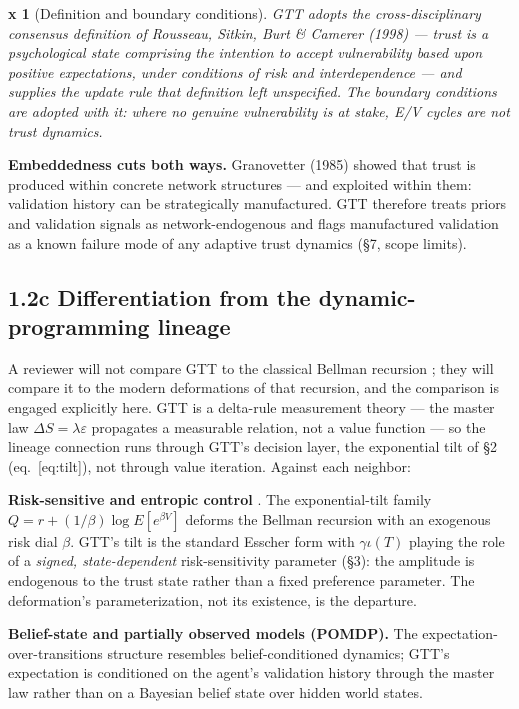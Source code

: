 \documentclass[
]{article}
\begin{document}
\textbf{x 1} (Definition and boundary conditions). \emph{GTT adopts the
cross-disciplinary consensus definition of Rousseau, Sitkin, Burt \&
Camerer (1998) --- trust is a psychological state comprising the
intention to accept vulnerability based upon positive expectations,
under conditions of risk and interdependence --- and supplies the update
rule that definition left unspecified. The boundary conditions are
adopted with it: where no genuine vulnerability is at stake, E/V cycles
are not trust dynamics.}

\textbf{Embeddedness cuts both ways.} Granovetter (1985) showed that
trust is produced within concrete network structures --- and exploited
within them: validation history can be strategically manufactured. GTT
therefore treats priors and validation signals as network-endogenous and
flags manufactured validation as a known failure mode of any adaptive
trust dynamics (§7, scope limits).

\subsection{1.2c Differentiation from the dynamic-programming
lineage}\label{c-differentiation-from-the-dynamic-programming-lineage}

A reviewer will not compare GTT to the classical Bellman recursion ;
they will compare it to the modern deformations of that recursion, and
the comparison is engaged explicitly here. GTT is a delta-rule
measurement theory --- the master law \(\Delta S = \lambda\varepsilon\)
propagates a measurable relation, not a value function --- so the
lineage connection runs through GTT's decision layer, the exponential
tilt of §2 (eq.~{[}eq:tilt{]}), not through value iteration. Against
each neighbor:

\textbf{Risk-sensitive and entropic control} . The exponential-tilt
family \(Q = r + (1/\beta)\log E[e^{\beta V}]\) deforms the Bellman
recursion with an exogenous risk dial \(\beta\). GTT's tilt is the
standard Esscher form with \(\gamma\iota(T)\) playing the role of a
\emph{signed, state-dependent} risk-sensitivity parameter (§3): the
amplitude is endogenous to the trust state rather than a fixed
preference parameter. The deformation's parameterization, not its
existence, is the departure.

\textbf{Belief-state and partially observed models (POMDP).} The
expectation-over-transitions structure resembles belief-conditioned
dynamics; GTT's expectation is conditioned on the agent's validation
history through the master law rather than on a Bayesian belief state
over hidden world states.
\end{document}

